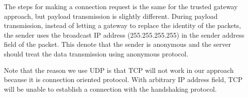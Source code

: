 The steps for making a connection request is the same for the trusted
gateway approach, but payload transmission is slightly different.
During payload transmission, instead of letting a gateway to replace the
identity of the packets, the sender uses the broadcast IP address
(255.255.255.255) in the sender address field of the packet. This denote
that the sender is anonymous and the server should treat the data transmission
using anonymous protocol.

Note that the reason we use UDP is that TCP will not work in our approach
because it is connection oriented protocol. With arbitrary IP address field,
TCP will be unable to establish a connection with the handshaking protocol.

